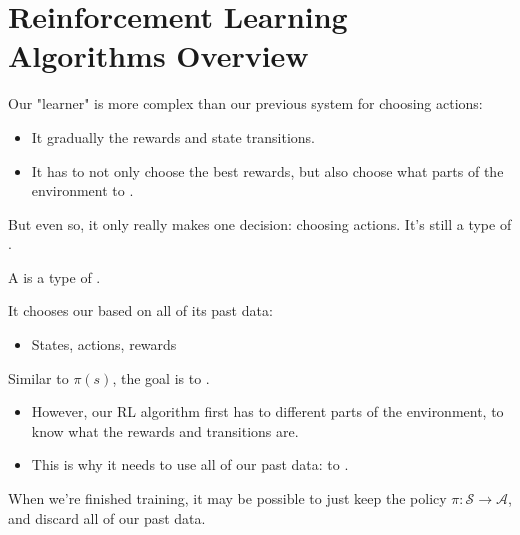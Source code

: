         

    \pagebreak

\section{Reinforcement Learning Algorithms Overview}

    Our "learner" is more complex than our previous system for choosing actions:

    \begin{itemize}
        \item It gradually  the rewards and state transitions.
        \item It has to not only choose the best rewards, but also choose what parts of the environment to .
    \end{itemize}

    But even so, it only really makes one decision: choosing actions. It's still a type of .\\

    \begin{concept}
        A  is a type of .

        It chooses our  based on all of its past data:

        \begin{itemize}
            \item States, actions, rewards
        \end{itemize}

        \subsecdiv

        Similar to $\pi(s)$, the goal is to .

        \begin{itemize}
            \item However, our RL algorithm first has to  different parts of the environment, to know what the rewards and transitions are.
            \item This is why it needs to use all of our past data: to .
        \end{itemize}
    \end{concept}

    When we're finished training, it may be possible to just keep the policy $\pi: \mathcal{S} \to \mathcal{A}$, and discard all of our past data.


